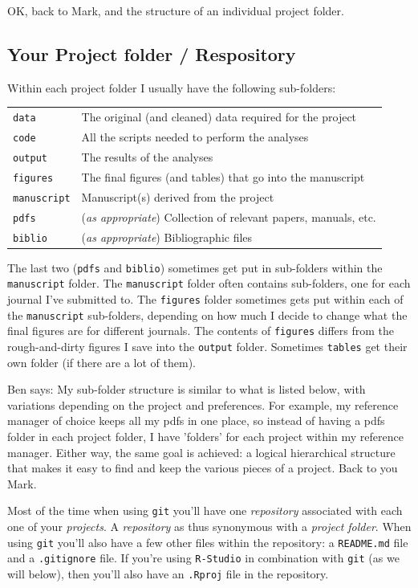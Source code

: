 \documentclass[12pt,letterpaper]{article}
\begin{document}
OK, back to Mark, and the structure of an individual project folder.

\subsection{Your Project folder / Respository} \label{projectfolder}
Within each project folder I  usually have the following sub-folders:

\begin{tabular}{ll}
 \texttt{data} & The original (and cleaned) data required for the project\\
 \texttt{code} & All the scripts needed to perform the analyses \\
 \texttt{output} & The results of the analyses \\
 \texttt{figures} & The final figures (and tables) that go into the manuscript\\
 \texttt{manuscript} & Manuscript(s) derived from the project\\
 \texttt{pdfs} & (\emph{as appropriate}) Collection of relevant papers, manuals, etc.\\
 \texttt{biblio} & (\emph{as appropriate}) Bibliographic files\\
\end{tabular}

The last two (\texttt{pdfs} and \texttt{biblio}) sometimes get put in sub-folders within the \texttt{manuscript} folder.  The  \texttt{manuscript} folder often contains sub-folders, one for each journal I've submitted to.  The \texttt{figures} folder sometimes gets put within each of the  \texttt{manuscript} sub-folders, depending on how much I decide to change what the final figures are for different journals.  The contents of \texttt{figures} differs from the rough-and-dirty figures I save into the \texttt{output} folder.  Sometimes \texttt{tables} get their own folder (if there are a lot of them). 

Ben says: My sub-folder structure is similar to what is listed below, with variations depending on the project and preferences. For example, my reference manager of choice keeps all my pdfs in one place, so instead of having a pdfs folder in each project folder, I have 'folders' for each project within my reference manager. Either way, the same goal is achieved: a logical hierarchical structure that makes it easy to find and keep the various pieces of a project. Back to you Mark.

Most of the time when using \texttt{git} you'll have one \emph{repository} associated with each one of your \emph{projects}.  A \emph{repository} as thus synonymous with a \emph{project folder}.  When using \texttt{git} you'll also have a few other files within the repository: a \texttt{README.md} file and a \texttt{.gitignore} file.  If you're using \texttt{R-Studio} in combination with \texttt{git} (as we will below), then you'll also have an \texttt{.Rproj} file in the repository.
\end{document}
